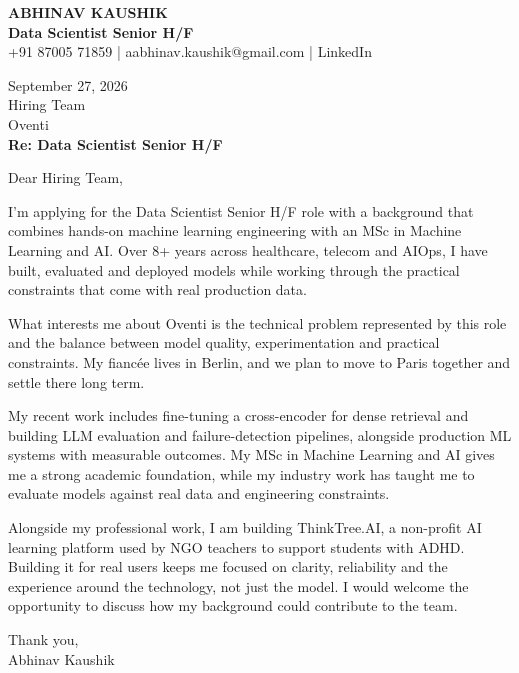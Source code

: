 \documentclass[10pt,a4paper]{article}
\begin{document}
\begin{center}
{\Large\bfseries ABHINAV KAUSHIK}\\[2pt]
{\bfseries Data Scientist Senior H/F}\\[2pt]
+91 87005 71859 \quad | \quad aabhinav.kaushik@gmail.com \quad | \quad LinkedIn
\end{center}
\vspace{8pt}
September 27, 2026\\[6pt]
Hiring Team\\
Oventi\\[4pt]
\textbf{Re: Data Scientist Senior H/F}

Dear Hiring Team,

I’m applying for the Data Scientist Senior H/F role with a background that combines hands-on machine learning engineering with an MSc in Machine Learning and AI. Over 8+ years across healthcare, telecom and AIOps, I have built, evaluated and deployed models while working through the practical constraints that come with real production data.

What interests me about Oventi is the technical problem represented by this role and the balance between model quality, experimentation and practical constraints. My fiancée lives in Berlin, and we plan to move to Paris together and settle there long term.

My recent work includes fine-tuning a cross-encoder for dense retrieval and building LLM evaluation and failure-detection pipelines, alongside production ML systems with measurable outcomes. My MSc in Machine Learning and AI gives me a strong academic foundation, while my industry work has taught me to evaluate models against real data and engineering constraints.

Alongside my professional work, I am building ThinkTree.AI, a non-profit AI learning platform used by NGO teachers to support students with ADHD. Building it for real users keeps me focused on clarity, reliability and the experience around the technology, not just the model. I would welcome the opportunity to discuss how my background could contribute to the team.

Thank you,\\
Abhinav Kaushik
\end{document}
